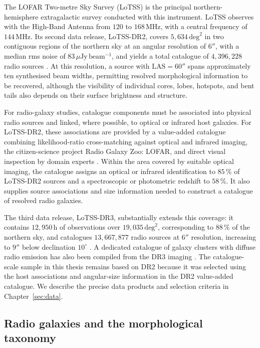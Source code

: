 The LOFAR Two-metre Sky Survey (LoTSS) is the principal northern-hemisphere extragalactic survey conducted with this instrument. LoTSS observes with the High-Band Antenna from $120$ to $168\,\mathrm{MHz}$, with a central frequency of $144\,\mathrm{MHz}$. Its second data release, LoTSS-DR2, covers $5{,}634\,\mathrm{deg}^{2}$ in two contiguous regions of the northern sky at an angular resolution of $6''$, with a median rms noise of $83\,\mu\mathrm{Jy\,beam^{-1}}$, and yields a total catalogue of $4{,}396{,}228$ radio sources \citep{Shimwell2022}. At this resolution, a source with $\mathrm{LAS}=60''$ spans approximately ten synthesised beam widths, permitting resolved morphological information to be recovered, although the visibility of individual cores, lobes, hotspots, and bent tails also depends on their surface brightness and structure.

For radio-galaxy studies, catalogue components must be associated into physical radio sources and linked, where possible, to optical or infrared host galaxies. For LoTSS-DR2, these associations are provided by a value-added catalogue combining likelihood-ratio cross-matching against optical and infrared imaging, the citizen-science project Radio Galaxy Zoo: LOFAR, and direct visual inspection by domain experts \citep{Hardcastle2023}. Within the area covered by suitable optical imaging, the catalogue assigns an optical or infrared identification to $85\,\%$ of LoTSS-DR2 sources and a spectroscopic or photometric redshift to $58\,\%$. It also supplies source associations and size information needed to construct a catalogue of resolved radio galaxies.

The third data release, LoTSS-DR3, substantially extends this coverage: it contains $12{,}950\,\mathrm{h}$ of observations over $19{,}035\,\mathrm{deg}^{2}$, corresponding to $88\,\%$ of the northern sky, and catalogues $13{,}667{,}877$ radio sources at $6''$ resolution, increasing to $9''$ below declination $10^{\circ}$ \citep{Shimwell2026}. A dedicated catalogue of galaxy clusters with diffuse radio emission has also been compiled from the DR3 imaging \citep{Stuardi2026}. The catalogue-scale sample in this thesis remains based on DR2 because it was selected using the host associations and angular-size information in the DR2 value-added catalogue. We describe the precise data products and selection criteria in Chapter~\ref{sec:data}.

\subsection{Radio galaxies and the morphological taxonomy}
\label{sec:bg_taxonomy}


